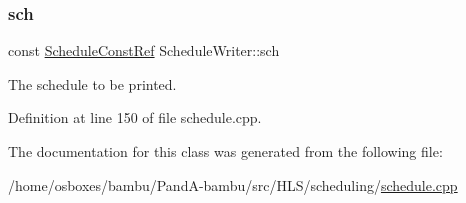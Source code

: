 \subsubsection{\texorpdfstring{sch}{sch}}
{\footnotesize\ttfamily const \hyperlink{schedule_8hpp_a85e4dea8a1611026193d8ca13fc5a260}{Schedule\+Const\+Ref} Schedule\+Writer\+::sch\hspace{0.3cm}{\ttfamily [private]}}



The schedule to be printed. 



Definition at line 150 of file schedule.\+cpp.



The documentation for this class was generated from the following file\+:\begin{DoxyCompactItemize}
\item 
/home/osboxes/bambu/\+Pand\+A-\/bambu/src/\+H\+L\+S/scheduling/\hyperlink{schedule_8cpp}{schedule.\+cpp}\end{DoxyCompactItemize}
